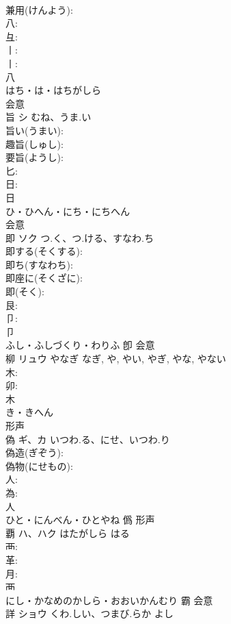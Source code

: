 \documentclass[8pt]{extreport}
\begin{document}
\begin{CJK}{UTF8}{min}
\\	兼用(けんよう): 
\\	八: 
\\	彑: 
\\	丨: 
\\	丨: 
\\	八	
\\	はち・は・はちがしら	
\\	会意 
\\	旨	シ	むね、うま.い		
\\	旨い(うまい): 
\\	趣旨(しゅし): 
\\	要旨(ようし): 
\\	匕: 
\\	日: 
\\	日	
\\	ひ・ひへん・にち・にちへん	
\\	会意 
\\	即	ソク	つ.く、つ.ける、すなわ.ち		
\\	即する(そくする): 
\\	即ち(すなわち): 
\\	即座に(そくざに): 
\\	即(そく): 
\\	艮: 
\\	卩: 
\\	卩	
\\	ふし・ふしづくり・わりふ	卽	会意 
\\	柳	リュウ	やなぎ	なぎ, や, やい, やぎ, やな, やない	
\\	木: 
\\	卯: 
\\	木	
\\	き・きへん	
\\	形声 
\\	偽	ギ、カ	いつわ.る、にせ、いつわ.り		
\\	偽造(ぎぞう): 
\\	偽物(にせもの): 
\\	人: 
\\	為: 
\\	人	
\\	ひと・にんべん・ひとやね	僞	形声 
\\	覇	ハ、ハク	はたがしら	はる	
\\	襾: 
\\	革: 
\\	月: 
\\	襾	
\\	にし・かなめのかしら・おおいかんむり	霸	会意 
\\	詳	ショウ	くわ.しい、つまび.らか	よし	

\end{CJK}
\end{document}
